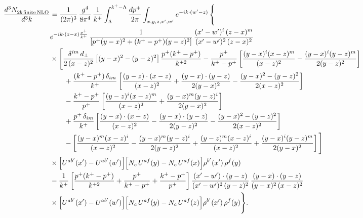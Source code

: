 \begin{align}
\frac{d^{3}N_{2b\,\rm finite\, NLO}^{\rm}}{d^{3}k} & = \frac{1}{(2\pi)^{3}}\,\frac{g^{4}}{8\pi^{4}}\,\frac{1}{k^{+}}\int_{\Lambda}^{k^{+}-\Lambda}\frac{dp^{+}}{2\pi}\int_{x,y,z,x',w'}e^{-ik\cdot(w'-z)}\,\Bigg\{\notag\\
&e^{-ik\cdot(z-x)\frac{p^{+}}{k^{+}}}\,\frac{1}{\left[p^{+}(y-x)^{2}+(k^{+}-p^{+})(y-z)^{2}\right]}\,\frac{(x'-w')^{i}\,(z-x)^{m}}{(x'-w')^{2}\,(z-x)^{2}}\notag\\
&\times\Bigg[\frac{\delta^{im}\,d_{\perp}}{2\,(x-z)^{2}}\left[(y-x)^{2}-(y-z)^{2}\right]\frac{p^{+}(k^{+}-p^{+})}{k^{+2}}
-\frac{p^{+}}{k^{+}-p^{+}}\left[\frac{(y-x)^{i}(x-z)^{m}}{(x-z)^{2}}-\frac{(y-x)^{i}(y-z)^{m}}{2(y-z)^{2}}\right]\notag\\
&\qquad+\frac{(k^{+}-p^{+})\,\delta_{im}}{k^{+}}\left[\frac{(y-z)\cdot(x-z)}{(x-z)^{2}}+\frac{(y-x)\cdot(y-z)}{2(y-x)^{2}}-\frac{(y-x)^{2}-(y-z)^{2}}{2(x-z)^{2}}\right]\notag\\
&\qquad-\frac{k^{+}-p^{+}}{p^{+}}\left[\frac{(y-z)^{i}(x-z)^{m}}{(x-z)^{2}}+\frac{(y-x)^{m}(y-z)^{i}}{2(y-x)^{2}}\right]\notag\\
&\qquad+\frac{p^{+}\,\delta_{im}}{k^{+}}\left[\frac{(y-x)\cdot(x-z)}{(x-z)^{2}}-\frac{(y-x)\cdot(y-z)}{2(y-z)^{2}}-\frac{(y-x)^{2}-(y-z)^{2}}{2(x-z)^{2}}\right]\notag\\
&\qquad-\left[\frac{(y-x)^{m}(x-z)^{i}}{(x-z)^{2}}-\frac{(y-x)^{m}(y-z)^{i}}{2(y-z)^{2}}+\frac{(y-z)^{m}(x-z)^{i}}{(x-z)^{2}}+\frac{(y-x)^{i}(y-z)^{m}}{2(y-x)^{2}}\right]\Bigg]\notag\\
&\times\Big[U^{ab'}(x')-U^{ab'}(w')\Big]\Big[N_{c}\,U^{af}(y)-N_{c}\,U^{af}(x)\Big]\rho^{b'}(x')\,\rho^{f}(y)\notag\\
&-\frac{1}{k^{+}}\left[\frac{p^{+}(k^{+}-p^{+})}{k^{+2}}+\frac{p^{+}}{k^{+}-p^{+}}+\frac{k^{+}-p^{+}}{p^{+}}\right]
\frac{(x'-w')\cdot(y-z)}{(x'-w')^{2}\,(y-z)^{2}}\,\frac{(y-x)\cdot(y-z)}{(y-x)^{2}\,(x-z)^{2}}\notag\\
&\times\Big[U^{ab'}(x')-U^{ab'}(w')\Big]\Big[N_{c}\,U^{af}(y)-N_{c}\,U^{af}(z)\Big]\rho^{b'}(x')\,\rho^{f}(y)\Bigg\}.
\end{align}
